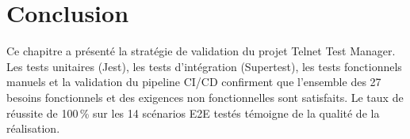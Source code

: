 \section*{Conclusion}

Ce chapitre a présenté la stratégie de validation du projet Telnet Test
Manager. Les tests unitaires (Jest), les tests d'intégration (Supertest),
les tests fonctionnels manuels et la validation du pipeline CI/CD
confirment que l'ensemble des 27 besoins fonctionnels et des exigences
non fonctionnelles sont satisfaits. Le taux de réussite de 100\,\% sur les
14 scénarios E2E testés témoigne de la qualité de la réalisation.
